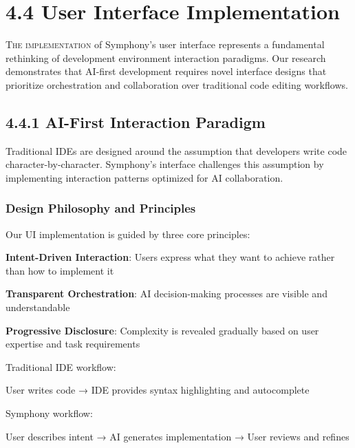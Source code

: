 

\section{4.4 User Interface Implementation}
\label{sec:user-inteface-impl}

\lettrine{T}{he implementation} of Symphony's user interface represents a fundamental rethinking of development environment interaction paradigms. Our research demonstrates that AI-first development requires novel interface designs that prioritize orchestration and collaboration over traditional code editing workflows.

\subsection*{4.4.1 AI-First Interaction Paradigm}
\label{subsec:ai-first-interaction}

Traditional IDEs are designed around the assumption that developers write code character-by-character. Symphony's interface challenges this assumption by implementing interaction patterns optimized for AI collaboration.

\subsubsection*{Design Philosophy and Principles}

Our UI implementation is guided by three core principles:

\begin{compactlist}
    \item \textbf{Intent-Driven Interaction}: Users express what they want to achieve rather than how to implement it
    \item \textbf{Transparent Orchestration}: AI decision-making processes are visible and understandable
    \item \textbf{Progressive Disclosure}: Complexity is revealed gradually based on user expertise and task requirements
\end{compactlist}

\begin{infobox}[title=Interaction Paradigm Shift]
Traditional IDE workflow:
\begin{compactlist}
    \item User writes code → IDE provides syntax highlighting and autocomplete
\end{compactlist}

Symphony workflow:
\begin{compactlist}
    \item User describes intent → AI generates implementation → User reviews and refines
\end{compactlist}
\end{infobox}

